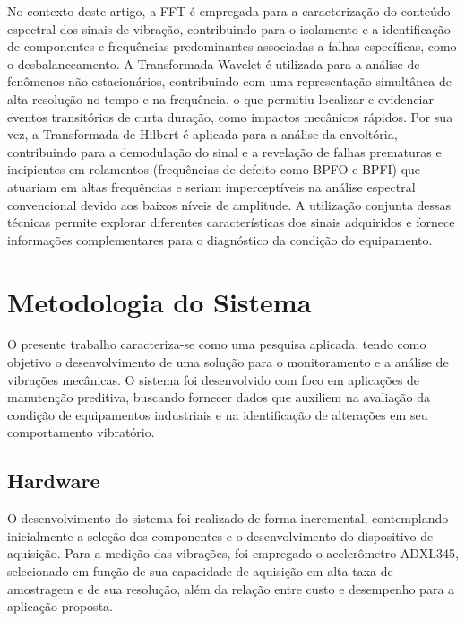 \documentclass[conference]{IEEEtran}
\begin{document}
No contexto deste artigo, a FFT é empregada para a caracterização do conteúdo espectral dos sinais de vibração, contribuindo para o isolamento e a identificação de componentes e frequências predominantes associadas a falhas específicas, como o desbalanceamento. A Transformada Wavelet é utilizada para a análise de fenômenos não estacionários, contribuindo com uma representação simultânea de alta resolução no tempo e na frequência, o que permitiu localizar e evidenciar eventos transitórios de curta duração, como impactos mecânicos rápidos. Por sua vez, a Transformada de Hilbert é aplicada para a análise da envoltória, contribuindo para a demodulação do sinal e a revelação de falhas prematuras e incipientes em rolamentos (frequências de defeito como BPFO e BPFI) que atuariam em altas frequências e seriam imperceptíveis na análise espectral convencional devido aos baixos níveis de amplitude. A utilização conjunta dessas técnicas permite explorar diferentes características dos sinais adquiridos e fornece informações complementares para o diagnóstico da condição do equipamento.

\section{Metodologia do Sistema}

O presente trabalho caracteriza-se como uma pesquisa aplicada, tendo como objetivo o desenvolvimento de uma solução para o monitoramento e a análise de vibrações mecânicas. O sistema foi desenvolvido com foco em aplicações de manutenção preditiva, buscando fornecer dados que auxiliem na avaliação da condição de equipamentos industriais e na identificação de alterações em seu comportamento vibratório.

\subsection{Hardware}

O desenvolvimento do sistema foi realizado de forma incremental, contemplando inicialmente a seleção dos componentes e o desenvolvimento do dispositivo de aquisição. Para a medição das vibrações, foi empregado o acelerômetro ADXL345, selecionado em função de sua capacidade de aquisição em alta taxa de amostragem e de sua resolução, além da relação entre custo e desempenho para a aplicação proposta.
\end{document}
